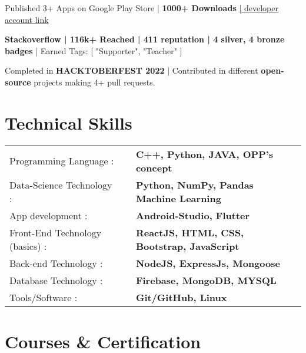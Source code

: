 \documentclass[a4,11pt]{article}
\begin{document}
     Published 3+ Apps on Google Play Store | \textbf{1000+ Downloads} \href{https://play.google.com/store/apps/dev?id=5576110735738802736}{| developer account link}
     \vspace{-0.02cm}

     \textbf{Stackoverflow | 116k+ Reached | 411 reputation | 4 silver, 4 bronze badges }| Earned Tags: [ "Supporter", "Teacher" ]
     \vspace{-0.02cm}

     Completed in \textbf{HACKTOBERFEST 2022} | Contributed in different \textbf{open-source} projects making 4+ pull requests. 
    

\vspace{0.4cm}
    
\section{Technical Skills} 
\vspace{-0.1cm}
\begin{tabular}{p{15em} p{2em} p{43em}}
\normalsize{Programming Language :} && \textbf{C++, Python, JAVA, OPP’s concept}  \\
\normalsize{Data-Science Technology :} && \textbf{Python, NumPy, Pandas Machine Learning} \\ 
\normalsize{App development :} &&\textbf{Android-Studio, Flutter}  \\
\normalsize{Front-End Technology (basics) :} && \textbf{ReactJS, HTML, CSS, Bootstrap, JavaScript} \\
\normalsize{Back-end Technology :} && \textbf{NodeJS, ExpressJs, Mongoose} \\   
\normalsize{Database Technology :} && \textbf{Firebase, MongoDB, MYSQL}  \\
\normalsize{Tools/Software :} && \textbf{Git/GitHub, Linux} \\
\end{tabular}
\vspace{-0.4cm}

\section{Courses \& Certification}
\vspace{0.0cm}
\end{document}
